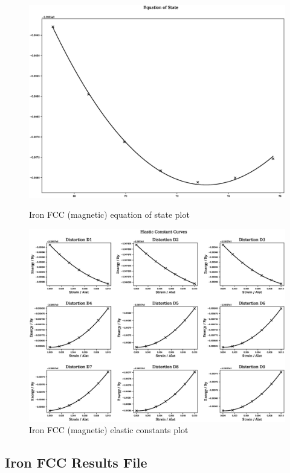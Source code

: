 \FloatBarrier
\begin{figure}[!htb]
\includegraphics[width=\linewidth]{appendix/dft_property_calculations/fccfe/eos.eps}
\caption{Iron FCC (magnetic) equation of state plot}
\label{fig:feeosplot3}
\endminipage\hfill
{}
\includegraphics[width=\linewidth]{appendix/dft_property_calculations/fccfe/ec.eps}
\caption{Iron FCC (magnetic) elastic constants plot}
\label{fig:feecplot3}
\endminipage
\end{figure}
\FloatBarrier


\clearpage
\FloatBarrier
\subsection{Iron FCC Results File}

